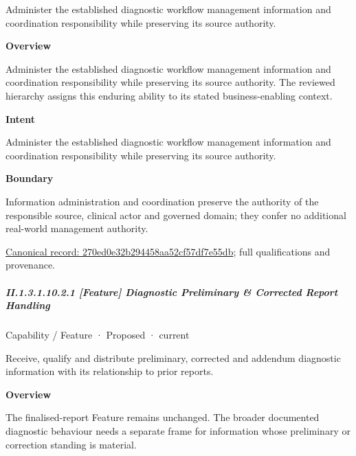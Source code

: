 Administer the established diagnostic workflow management information and coordination responsibility while preserving its source authority.



\textbf{Overview}



Administer the established diagnostic workflow management information and coordination responsibility while preserving its source authority. The reviewed hierarchy assigns this enduring ability to its stated business-enabling context.



\textbf{Intent}



Administer the established diagnostic workflow management information and coordination responsibility while preserving its source authority.



\textbf{Boundary}



Information administration and coordination preserve the authority of the responsible source, clinical actor and governed domain; they confer no additional real-world management authority.


{\footnotesize \href{../../../../continuum/strategy/capability/270ed0e32b294458aa52cf57df7e55db.md}{Canonical record: 270ed0e32b294458aa52cf57df7e55db}; full qualifications and provenance.}\par
\subparagraph*{II.1.3.1.10.2.1 [Feature] Diagnostic Preliminary \& Corrected Report Handling}
\label{navigation:II.1.3.1.10.2.1}

\label{element:7449ee4dada7424ea6d39785258b4981}
{\small Capability / Feature · Proposed · current}\par

Receive, qualify and distribute preliminary, corrected and addendum diagnostic information with its relationship to prior reports.



\textbf{Overview}



The finalised-report Feature remains unchanged. The broader documented diagnostic behaviour needs a separate frame for information whose preliminary or correction standing is material.



